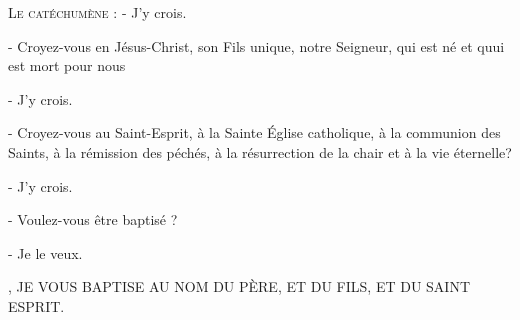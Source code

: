 \documentclass[%
fontsize=10%
,a5paper%
,DIV=15%
]{scrartcl}
\def\rubrum{\color{rubrum}}%
\def\nigra{\color{black}}
\begin{document}
\textsc{Le catéchumène :} - J'y crois.

- Croyez-vous en Jésus-Christ, son Fils unique, notre
Seigneur, qui est né et quui est mort pour nous

- J'y crois.

- Croyez-vous au Saint-Esprit, à la Sainte Église
catholique, à la communion des Saints, à la rémission
des péchés, à la résurrection de la chair et à la vie
éternelle?

- J'y crois.

- Voulez-vous être baptisé ?

- Je le veux.

\textsc{\rubrum{N.},\nigra{} JE VOUS BAPTISE AU NOM DU PÈRE, ET DU FILS, ET DU SAINT ESPRIT.}





\end{document}

